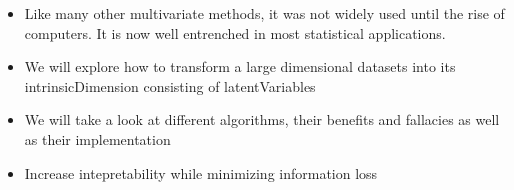 \begin{itemize}
	\item Like many other multivariate methods, it was not widely used until the rise of computers. 
	It is now well entrenched in most statistical applications. \cite{Jolliffe2002book}
	\item We will explore how to transform a large dimensional datasets into its \gls{intrinsicDimension} consisting of \glspl{latentVariable}
	\item We will take a look at different algorithms, their benefits and fallacies as well as their implementation
	\item Increase intepretability while minimizing information loss \cite{jolliffe2016principal}
\end{itemize}
